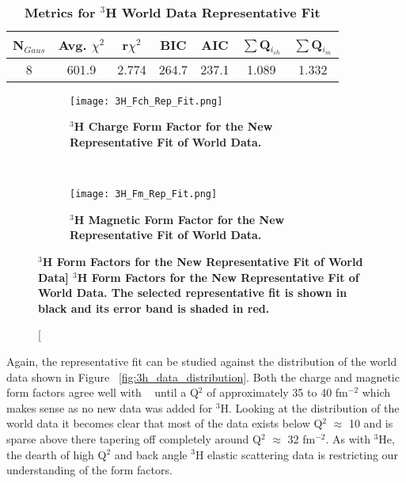 \begin{table}[!h]
\centering
\begin{tabular}{|c c c c c c c|}
\hline
\textbf{N$_{Gaus}$} & \textbf{Avg. $\chi^2$} & \textbf{r$\chi^2$} & \textbf{BIC} & \textbf{AIC} & \textbf{$\sum$Q$_{i_{ch}}$} & \textbf{$\sum$Q$_{i_{m}}$}\\
\hline
8 & 601.9 & 2.774 & 264.7 & 237.1 & 1.089 & 1.332\\
\hline
\end{tabular}
\caption{\bf{Metrics for $^3$H World Data Representative Fit}}
\label{tab:3h_rep_fit_stats}
\end{table}

\begin{figure}[!ht]
\begin{subfigure}{1.\textwidth}
  \centering
  \texttt{[image: 3H\_Fch\_Rep\_Fit.png]}
  \caption{\bf{$^3$H Charge Form Factor for the New Representative Fit of World Data.}}
  \label{fig:3h_fch_rep_fit}
\end{subfigure}\\
\begin{subfigure}{1.\textwidth}
  \centering
  \texttt{[image: 3H\_Fm\_Rep\_Fit.png]}
  \caption{\bf{$^3$H Magnetic Form Factor for the New Representative Fit of World Data.}}
  \label{fig:3h_fm_rep_fit}
\end{subfigure}
\caption[\bf{$^3$H Form Factors for the New Representative Fit of World Data}] {
{\bf{$^3$H Form Factors for the New Representative Fit of World Data.}} The selected representative fit is shown in black and its error band is shaded in red.}
\label{fig:3h_rep_fit}
\end{figure}

Again, the representative fit can be studied against the distribution of the world data shown in Figure ~\ref{fig:3h_data_distribution}. Both the charge and magnetic form factors agree well with  ~\cite{Article:Amroun} until a Q$^2$ of approximately 35 to 40 fm$^{-2}$ which makes sense as no new data was added for $^3$H. Looking at the distribution of the world data it becomes clear that most of the data exists below Q$^2$ $\approx$ 10 and is sparse above there tapering off completely around Q$^2$ $\approx$ 32 fm$^{-2}$. As with $^3$He, the dearth of high Q$^2$ and back angle $^3$H elastic scattering data is restricting our understanding of the form factors.

